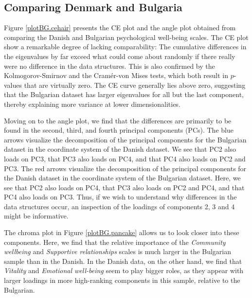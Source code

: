 \documentclass[a4paper,12pt]{article}
\begin{document}
\subsection*{Comparing Denmark and Bulgaria}
Figure \ref{plotBG.cehair} presents the CE plot and the angle plot obtained from comparing the Danish and Bulgarian psychological well-being scales. The CE plot show a remarkable degree of lacking comparability: The cumulative differences in the eigenvalues by far exceed what could come about randomly if there really were no difference in the data structures. This is also confirmed by the Kolmogorov-Smirnov and the Cram\'er-von Mises tests, which both result in $p$-values that are virtually zero. The CE curve generally lies above zero, suggesting that the Bulgarian dataset has larger eigenvalues for all but the last component, thereby explaining more variance at lower dimensionalities. 


Moving on to the angle plot, we find that the differences are primarily to be found in the second, third, and fourth principal components (PCs). The blue arrows visualize the decomposition of the principal components for the Bulgarian dataset in the coordinate system of the Danish dataset. We see that PC2 also loads on PC3, that PC3 also loads on PC4, and that PC4 also loads on PC2 and PC3. The red arrows visualize the decomposition of the principal components for the Danish dataset in the coordinate system of the Bulgarian dataset. Here, we see that PC2 also loads on PC4, that PC3 also loads on PC2 and PC4, and that PC4 also loads on PC3. Thus, if we wish to understand why differences in the data structures occur, an inspection of the loadings of components 2, 3 and 4 might be informative.

The chroma plot in Figure \ref{plotBG.pancake} allows us to look closer into these components. Here, we find that the relative importance of the \textit{Community wellbeing} and \textit{Supportive relationships} scales is much larger in the Bulgarian sample than in the Danish. In the Danish data, on the other hand, we find that \textit{Vitality} and \textit{Emotional well-being} seem to play bigger roles, as they appear with larger loadings in more high-ranking components in this sample, relative to the Bulgarian.
\end{document}
